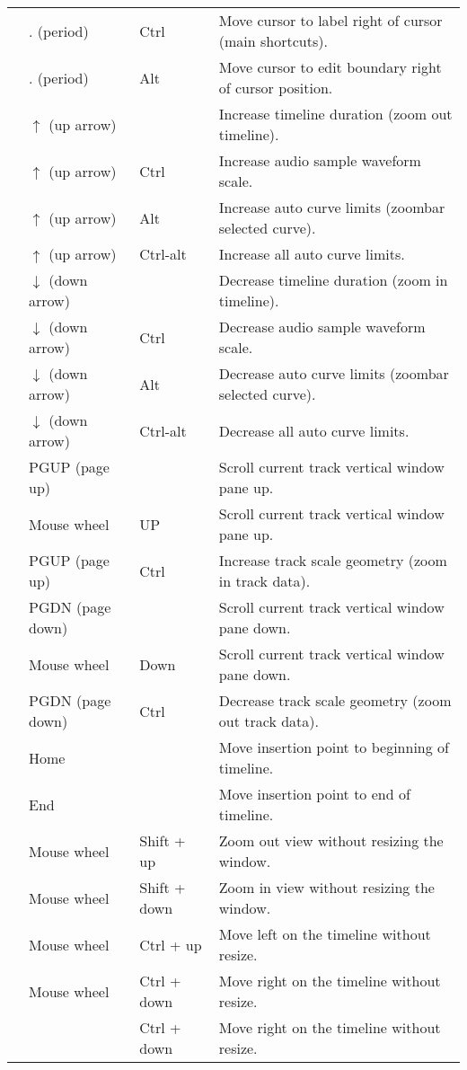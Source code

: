 \begin{longtable}[h]{>{\bfseries}p{}p{}p{}p{}}
  & . (period) & Ctrl & Move cursor to label right of cursor (main shortcuts). \\
  & . (period) & Alt & Move cursor to edit boundary right of cursor position. \\
  & $\uparrow$ (up arrow) &  & Increase timeline duration (zoom out timeline). \\
  & $\uparrow$ (up arrow) & Ctrl & Increase audio sample waveform scale. \\
  & $\uparrow$ (up arrow) & Alt & Increase auto curve limits (zoombar selected curve). \\
  & $\uparrow$ (up arrow) & Ctrl-alt & Increase all auto curve limits. \\
  & $\downarrow$ (down arrow) &  & Decrease timeline duration (zoom in timeline). \\
  & $\downarrow$ (down arrow) & Ctrl & Decrease audio sample waveform scale. \\
  & $\downarrow$ (down arrow) & Alt & Decrease auto curve limits (zoombar selected curve). \\
  & $\downarrow$ (down arrow) & Ctrl-alt & Decrease all auto curve limits. \\
  & PGUP (page up) &  & Scroll current track vertical window pane up. \\
  & Mouse wheel & UP & Scroll current track vertical window pane up. \\
  & PGUP (page up) & Ctrl & Increase track scale geometry (zoom in track data). \\
  & PGDN (page down) &  & Scroll current track vertical window pane down. \\
  & Mouse wheel & Down & Scroll current track vertical window pane down. \\
  & PGDN (page down) & Ctrl & Decrease track scale geometry (zoom out track data). \\
  & Home &  & Move insertion point to beginning of timeline. \\
  & End &  & Move insertion point to end of timeline. \\
  & Mouse wheel & Shift + up & Zoom out view without resizing the window. \\
  & Mouse wheel & Shift + down & Zoom in view without resizing the window. \\
  & Mouse wheel & Ctrl + up & Move left on the timeline without resize. \\
  & Mouse wheel & Ctrl + down & Move right on the timeline without resize. \\
  &  & Ctrl + down & Move right on the timeline without resize. \\

\end{longtable}
